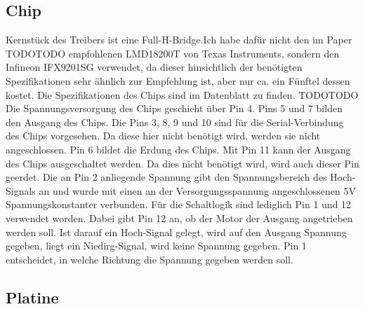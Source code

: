 
\subsection{Chip}

Kernstück des Treibers ist eine Full-H-Bridge.Ich habe dafür nicht den im Paper TODOTODO empfohlenen LMD18200T von Texas Instruments, sondern den Infineon IFX9201SG verwendet, da dieser hinsichtlich der benötigten Spezifikationen sehr ähnlich zur Empfehlung ist, aber nur ca. ein Fünftel dessen kostet. Die Spezifikationen des Chips sind im Datenblatt zu finden. TODOTODO Die Spannungsversorgung des Chips geschieht über Pin 4. Pins 5 und 7 bilden den Ausgang des Chips. Die Pins 3, 8, 9 und 10 sind für die Serial-Verbindung des Chips vorgesehen. Da diese hier nicht benötigt wird, werden sie nicht angeschlossen. Pin 6 bildet die Erdung des Chips. Mit Pin 11 kann der Ausgang des Chips ausgeschaltet werden. Da dies nicht benötigt wird, wird auch dieser Pin geerdet. Die an Pin 2 anliegende Spannung gibt den Spannungsbereich des Hoch-Signals an und wurde mit einen an der Versorgungsspannung angeschlossenen 5V Spannungskonstanter verbunden. Für die Schaltlogik sind lediglich Pin 1 und 12 verwendet worden. Dabei gibt Pin 12 an, ob der Motor der Ausgang angetrieben werden soll. Ist darauf ein Hoch-Signal gelegt, wird auf den Ausgang Spannung gegeben, liegt ein Niedirg-Signal, wird keine Spannung gegeben. Pin 1 entscheidet, in welche Richtung die Spannung gegeben werden soll.


\subsection{Platine}

